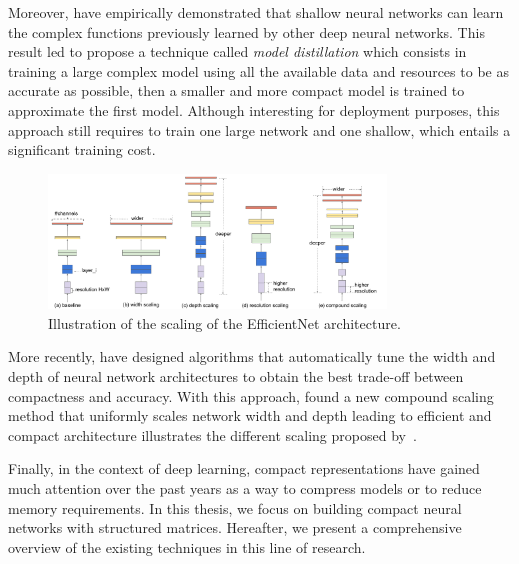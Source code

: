 Moreover, \citet{ba2014deep} have empirically demonstrated that shallow neural networks can learn the complex functions previously learned by other deep neural networks.
This result led \citet{hinton2015distilling} to propose a technique called \emph{model distillation} which consists in training a large complex model using all the available data and resources to be as accurate as possible, then a smaller and more compact model is trained to approximate the first model.
Although interesting for deployment purposes, this approach still requires to train one large network and one shallow, which entails a significant training cost.

\begin{figure}[t]
  \centering
  \includegraphics[width=0.80\textwidth]{figures/main/ch3-related_work/scalecompare.pdf}
  \caption{Illustration of the scaling of the EfficientNet architecture.}
  \label{figure:p1-ch3-illustration_efficientnet}
\end{figure}

More recently, \citet{zoph2018learning,real2019regularized} have designed algorithms that automatically tune the width and depth of neural network architectures to obtain the best trade-off between compactness and accuracy.
With this approach, \citet{tan2019efficientnet} found a new compound scaling method that uniformly scales network width and depth leading to efficient and compact architecture illustrates the different scaling proposed by~\citet{tan2019efficientnet}.

Finally, in the context of deep learning, compact representations have gained much attention over the past years as a way to compress models or to reduce memory requirements.
In this thesis, we focus on building compact neural networks with structured matrices.
Hereafter, we present a comprehensive overview of the existing techniques in this line of research.












